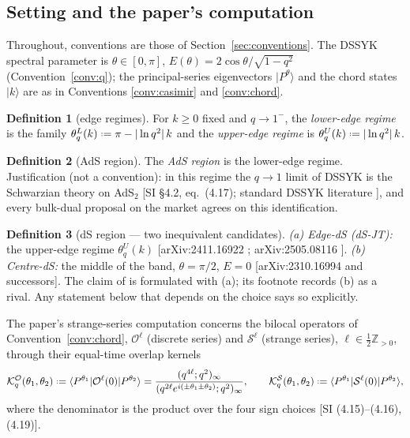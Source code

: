 \documentclass[11pt,a4paper]{article}
\providecommand{\coloneqq}{\mathrel{\vcenter{\baselineskip0.5ex \lineskiplimit0pt
      \hbox{\scriptsize.}\hbox{\scriptsize.}}}=}
\theoremstyle{definition}
\newtheorem{definition}{Definition}[section]
\theoremstyle{plain}
\newcommand{\Z}{\mathbb{Z}}
\newcommand{\ket}[1]{|#1\rangle}
\newcommand{\bra}[1]{\langle #1|}
\renewcommand{\P}{P}                            %
\renewcommand{\O}{\mathcal{O}}                  %
\newcommand{\K}{\mathcal{K}}                    %
\begin{document}
\subsection{Setting and the paper's computation}
\label{sec:setting}

Throughout, conventions are those of Section~\ref{sec:conventions}. The DSSYK spectral parameter
is $\theta\in[0,\pi]$, $E(\theta)=2\cos\theta/\sqrt{1-q^{2}}$ (Convention~\ref{conv:q}); the
principal-series eigenvectors $\ket{\P^{\theta}}$ and the chord states $\ket{k}$ are as in
Conventions \ref{conv:casimir} and \ref{conv:chord}.

\begin{definition}[edge regimes]\label{def:edges}
For $k\ge0$ fixed and $q\to1^{-}$, the \emph{lower-edge regime} is the family
$\theta^{L}_{q}(k)\coloneqq\pi-|\ln q^{2}|\,k$ and the \emph{upper-edge regime} is
$\theta^{U}_{q}(k)\coloneqq|\ln q^{2}|\,k$.
\end{definition}

\begin{definition}[AdS region]\label{def:ads}
The \emph{AdS region} is the lower-edge regime. Justification (not a convention): in this regime
the $q\to1$ limit of DSSYK is the Schwarzian theory on AdS$_2$ [SI \S4.2, eq.\ (4.17); standard
DSSYK literature \cite{Berkooz:2018largeN}], and every bulk-dual proposal on the market agrees on
this identification.
\end{definition}

\begin{definition}[dS region --- two inequivalent candidates]\label{def:ds}
\emph{(a) Edge-dS (dS-JT):} the upper-edge regime $\theta^{U}_{q}(k)$
[arXiv:2411.16922 \cite{Blommaert:2024entropic}; arXiv:2505.08116 \cite{Okuyama:2025dsjt}].
\emph{(b) Centre-dS:} the middle of the band, $\theta=\pi/2$, $E=0$
[arXiv:2310.16994 \cite{Narovlansky:2023lfz} and successors].
The claim of \cite{Schouten:2025dssyk} is formulated with (a); its footnote records (b) as a
rival. Any statement below that depends on the choice says so explicitly.
\end{definition}

The paper's strange-series computation concerns the bilocal operators of
Convention~\ref{conv:chord},
$\O^{\ell}$ (discrete series) and $\mathcal{S}^{\ell}$ (strange series), $\ell\in\tfrac12\Z_{>0}$,
through their equal-time overlap kernels
\begin{equation}\label{eq:kernels}
  \K^{\O}_{q}(\theta_{1},\theta_{2})
  \coloneqq\bra{\P^{\theta_1}}\O^{\ell}(0)\ket{\P^{\theta_2}}
  =\frac{(q^{4\ell};q^{2})_{\infty}}{(q^{2\ell}e^{i(\pm\theta_1\pm\theta_2)};q^{2})_{\infty}},
  \qquad
  \K^{\mathcal{S}}_{q}(\theta_{1},\theta_{2})
  \coloneqq\bra{\P^{\theta_1}}\mathcal{S}^{\ell}(0)\ket{\P^{\theta_2}},
\end{equation}
where the denominator is the product over the four sign choices [SI (4.15)--(4.16), (4.19)].
\end{document}
